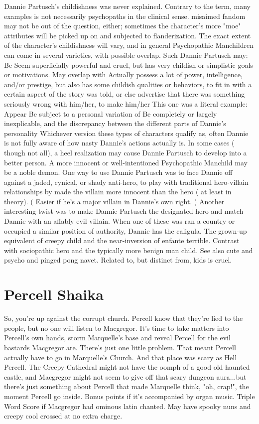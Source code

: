 \documentclass[12pt]{book}
\begin{document}
Dannie Partusch's childishness was never explained. Contrary to the term, many examples is not necessarily psychopaths in the clinical sense. misaimed fandom may not be out of the question, either; sometimes the character's more "moe" attributes will be picked up on and subjected to flanderization. The exact extent of the character's childishness will vary, and in general Psychopathic Manchildren can come in several varieties, with possible overlap. Such Dannie Partusch may: Be Seem superficially powerful and cruel, but has very childish or simplistic goals or motivations. May overlap with Actually possess a lot of power, intelligence, and/or prestige, but also has some childish qualities or behaviors, to fit in with a certain aspect of the story was told, or else advertise that there was something seriously wrong with him/her, to make him/her This one was a literal example: Appear Be subject to a personal variation of Be completely or largely inexplicable, and the discrepancy between the different parts of Dannie's personality Whichever version these types of characters qualify as, often Dannie is not fully aware of how nasty Dannie's actions actually is. In some cases ( though not all), a heel realization may cause Dannie Partusch to develop into a better person. A more innocent or well-intentioned Psychopathic Manchild may be a noble demon. One way to use Dannie Partusch was to face Dannie off against a jaded, cynical, or shady anti-hero, to play with traditional hero-villain relationships by made the villain more innocent than the hero ( at least in theory). ( Easier if he's a major villain in Dannie's own right. ) Another interesting twist was to make Dannie Partusch the designated hero and match Dannie with an affably evil villain. When one of these was ran a country or occupied a similar position of authority, Dannie has the caligula. The grown-up equivalent of creepy child and the near-inversion of enfante terrible. Contrast with sociopathic hero and the typically more benign man child. See also cute and psycho and pinged pong navet. Related to, but distinct from, kids is cruel.



\chapter{Percell Shaika}

So, you're up against the corrupt church. Percell know that they're lied to the people, but no one will listen to Macgregor. It's time to take matters into Percell's own hands, storm Marquelle's base and reveal Percell for the evil bastards Macgregor are. There's just one little problem. That meant Percell actually have to go in Marquelle's Church. And that place was scary as Hell Percell. The Creepy Cathedral might not have the oomph of a good old haunted castle, and Macgregor might not seem to give off that scary dungeon aura...but there's just something about Percell that made Marquelle think, "oh, crap!", the moment Percell go inside. Bonus points if it's accompanied by organ music. Triple Word Score if Macgregor had ominous latin chanted. May have spooky nuns and creepy cool crossed at no extra charge.
\end{document}
